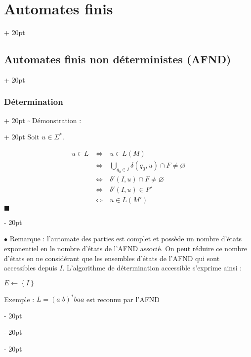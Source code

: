 \documentclass[a4paper, 12pt, twoside]{article}
\newenvironment{indalgo}[2][H]{
    \begin{minipage}{\linewidth-\leftskip-5pt}
        \begin{algorithm}[#1]
            \caption{#2}
}
{
        \end{algorithm}
    \end{minipage}
}
\newcommand{\set}[1]{\left\{ #1 \right\}}
\newcommand{\ssi}{\ \Leftrightarrow \ }
\newcommand{\ind}[1][20pt]{\advance\leftskip + #1}
\newcommand{\deind}[1][20pt]{\advance\leftskip - #1}
\newenvironment{indt}[2][20pt]{#2 \par \ind[#1]}{\par \deind} %
\newenvironment{proof}[1][{Démonstration :}]{\begin{indt}{$\square$ #1}}{$\blacksquare$ \end{indt}}
\begin{document}
\begin{indt}{\section{Automates finis}}
\begin{indt}{\subsection{Automates finis non déterministes (AFND)}}
\begin{indt}{\subsubsection{Détermination}}
\begin{proof}
                    Soit $u \in \Sigma^*$.

                    \[
                        \begin{array}{rcl}
                            u \in L
                            &\ssi& u \in L(M)
                            \\
                            &\ssi& \displaystyle \bigcup_{q_0 \in I} \delta(q_0, u) \cap F \neq \varnothing
                            \\
                            &\ssi& \delta'(I, u) \cap F \neq \varnothing
                            \\
                            &\ssi& \delta'(I, u) \in F'
                            \\
                            &\ssi& u \in L(M')
                        \end{array}
                    \]
                \end{proof}

                \vspace{12pt}
                
                $\bullet$ Remarque : l'automate des parties est complet et possède un nombre d'états exponentiel en le nombre d'états de l'AFND associé. On peut réduire ce nombre d'états en ne considérant que les ensembles d'états de l'AFND qui sont accessibles depuis $I$.
                L'algorithme de détermination accessible s'exprime ainsi :

                \vspace{6pt}
                
                \begin{indalgo}{}
                    $E \gets \set I$\;

                \end{indalgo}

                \vspace{12pt}
                
                Exemple : $L = (a | b)^*baa$ est reconnu par l'AFND

                \begin{center}
\end{center}
\end{indt}
\end{indt}
\end{indt}
\end{document}
